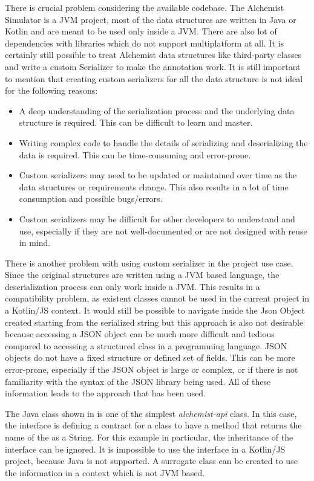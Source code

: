 There is crucial problem considering the available codebase. The Alchemist Simulator is a JVM project, most of the data structures are written in Java or Kotlin and are meant to be used only inside a JVM. There are also lot of dependencies with libraries which do not support multiplatform at all. It is certainly still possible to treat Alchemist data structures like third-party classes and write a custom Serializer to make the  annotation work. It is still important to mention that creating custom serializers for all the data structure is not ideal for the following reasons:
\begin{itemize}
	\item A deep understanding of the serialization process and the underlying data structure is required. This can be difficult to learn and master.
	\item Writing complex code to handle the details of serializing and deserializing the data is required. This can be time-consuming and error-prone.
	\item Custom serializers may need to be updated or maintained over time as the data structures or requirements change. This also results in a lot of time consumption and possible bugs/errors.
	\item Custom serializers may be difficult for other developers to understand and use, especially if they are not well-documented or are not designed with reuse in mind.
\end{itemize}

There is another problem with using custom serializer in the project use case. Since the original structures are written using a JVM based language, the deserialization process can only work inside a JVM. This results in a compatibility problem, as existent classes cannot be used in the current project in a Kotlin/JS context. It would still be possible to navigate inside the Json Object created starting from the serialized string but this approach is also not desirable because accessing a JSON object can be much more difficult and tedious compared to accessing a structured class in a programming language.
JSON objects do not have a fixed structure or defined set of fields. This can be more error-prone, especially if the JSON object is large or complex, or if there is not familiarity with the syntax of the JSON library being used. All of these information leads to the approach that has been used.\newline

The Java class shown in  is one of the simplest \textit{alchemist-api} class. In this case, the  interface is defining a contract for a class to have a  method that returns the name of the  as a String. For this example in particular, the inheritance of the  interface can be ignored. It is impossible to use the  interface in a Kotlin/JS project, because Java is not supported. A surrogate class can be created to use the  information in a context which is not JVM based.

